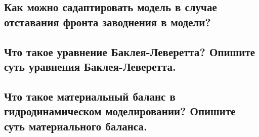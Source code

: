 \documentclass[main.tex]{subfiles}
\begin{document}
\newpage

\subsection{Как можно садаптировать модель в случае отставания фронта заводнения в модели?}

\newpage

\subsection{Что такое уравнение Баклея-Леверетта? Опишите суть уравнения Баклея-Леверетта.}

\newpage

\subsection{Что такое материальный баланс в гидродинамическом моделировании? Опишите суть материального баланса.}

\newpage
\end{document}
